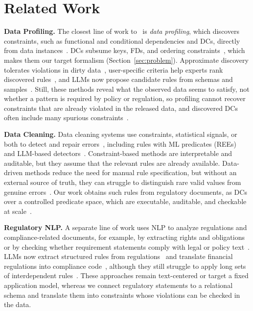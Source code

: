 \section{Related Work}
\label{sec:related}

\noindent\textbf{Data Profiling.}
The closest line of work to \system\ is \emph{data profiling}, which discovers constraints, such as functional and conditional dependencies and DCs, directly from data instances~\cite{profSurveyFelix2015,Huhtala1998TANE,Fan2009DiscoverCFD,Papenbrock2016HyFD,Bleifuss2017Hydra,chu2013discovering,Pena2022FastDC,icdePena2024}. DCs subsume keys, FDs, and ordering constraints~\cite{chu2013discovering}, which makes them our target formalism (Section~\ref{sec:problem}). Approximate discovery tolerates violations in dirty data~\cite{Pena2019DiscoveryDC,martin2026lima}, user-specific criteria help experts rank discovered rules~\cite{fan2023topk}, and LLMs now propose candidate rules from schemas and samples~\cite{biester2024llmclean,glock2026ledqer,li2026lcats}. Still, these methods reveal what the observed data seems to satisfy, not whether a pattern is required by policy or regulation, so profiling cannot recover constraints that are already violated in the released data, and discovered DCs often include many spurious constraints~\cite{martin2025false}.


\smallskip
\noindent\textbf{Data Cleaning.}
Data cleaning systems use constraints, statistical signals, or both to detect and repair errors~\cite{dataerrorsZiawash,chu2013holistic,holoclean,raha2019,peng2022garf,cleaningDeploy2024}, including rules with ML predicates (REEs)~\cite{bao2024rock} and LLM-based detectors~\cite{ni2025zeroed,zhang2024cleaning}. Constraint-based methods are interpretable and auditable, but they assume that the relevant rules are already available. Data-driven methods reduce the need for manual rule specification, but without an external source of truth, they can struggle to distinguish rare valid values from genuine errors~\cite{cleaningDeploy2024}. Our work obtains such rules from regulatory documents, as DCs over a controlled predicate space, which are executable, auditable, and checkable at scale~\cite{facet2021,liu2024rapidash,youri2024}.

\smallskip
\noindent\textbf{Regulatory NLP.}
A separate line of work uses NLP to analyze regulations and compliance-related documents, for example, by extracting rights and obligations or by checking whether requirement statements comply with legal or policy text~\cite{breaux2006regulatory,kiyavitskaya2008automating,amaral2023nlp,hassani2024rethinking,compliance2025ACMTSEM,masoudifard2024graphrag}. LLMs now extract structured rules from regulations~\cite{guliani2026dejure,hettiarachchi-etal-2025-code,kabzhan2025semantic} and translate financial regulations into compliance code~\cite{li2025compliance2code}, although they still struggle to apply long sets of interdependent rules~\cite{yu2026ruleworld,soni2026tam}. These approaches remain text-centered or target a fixed application model, whereas we connect regulatory statements to a relational schema and translate them into constraints whose violations can be checked in the data.

